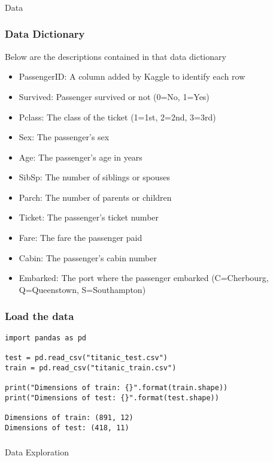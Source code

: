 \begin{frame}[fragile]\frametitle{}
\begin{center}
{\Large Data}
\end{center}
\end{frame}


\begin{frame}[fragile]\frametitle{Data Dictionary}
Below are the descriptions contained in that data dictionary
\begin{itemize}
\item PassengerID: A column added by Kaggle to identify each row
\item Survived: Passenger survived or not (0=No, 1=Yes)
\item Pclass: The class of the ticket (1=1st, 2=2nd, 3=3rd)
\item Sex: The passenger's sex
\item Age: The passenger's age in years
\item SibSp: The number of siblings or spouses 
\item Parch: The number of parents or children
\item Ticket: The passenger's ticket number
\item Fare: The fare the passenger paid
\item Cabin: The passenger's cabin number
\item Embarked: The port where the passenger embarked (C=Cherbourg, Q=Queenstown, S=Southampton)
\end{itemize}
\end{frame}



\begin{frame}[fragile]\frametitle{Load the data}
\begin{lstlisting}
import pandas as pd

test = pd.read_csv("titanic_test.csv")
train = pd.read_csv("titanic_train.csv")

print("Dimensions of train: {}".format(train.shape))
print("Dimensions of test: {}".format(test.shape))

Dimensions of train: (891, 12)
Dimensions of test: (418, 11)
\end{lstlisting}
\end{frame}

\begin{frame}[fragile]\frametitle{}
\begin{center}
{\Large Data Exploration}
\end{center}
\end{frame}

